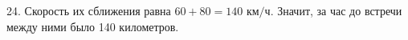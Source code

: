 24. Скорость их сближения равна $60+80=140\text{ км/ч}.$ Значит, за час до встречи между ними было 140 километров.\\
